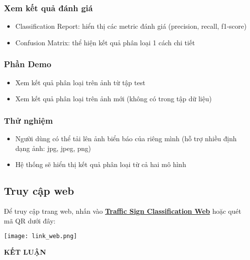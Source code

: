 \documentclass[a4paper,12pt]{article}
\begin{document}
\subsubsection{Xem kết quả đánh giá}
\begin{itemize}
    \item Classification Report: hiển thị các metric đánh giá (precision, recall, f1-score)
    \item Confusion Matrix: thể hiện kết quả phân loại 1 cách chi tiết
\end{itemize}

\subsubsection{Phần Demo}
\begin{itemize}
    \item Xem kết quả phân loại trên ảnh từ tập test
    \item Xem kết quả phân loại trên ảnh mới (không có trong tập dữ liệu)
\end{itemize}

\subsubsection{Thử nghiệm}
\begin{itemize}
    \item Người dùng có thể tải lên ảnh biển báo của riêng mình (hỗ trợ nhiều định dạng ảnh: jpg, jpeg, png)
    \item Hệ thống sẽ hiển thị kết quả phân loại từ cả hai mô hình
\end{itemize}

\subsection{Truy cập web}
\hspace{5mm}Để truy cập trang web, nhấn vào \href{https://traffic-sign-classification-through-images.streamlit.app/}{\textbf{Traffic Sign Classification Web}} hoặc quét mã QR dưới đây:
\begin{center}
    \texttt{[image: link\_web.png]}
\end{center}

\newpage
{}
\thispagestyle{empty}
\begin{center}
    \textbf{\large KẾT LUẬN}
\end{center}
\vspace{1cm}
\end{document}
